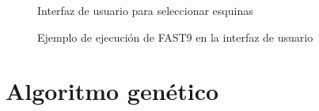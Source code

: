 \documentclass{report}
\begin{document}
\begin{figure}
	\caption{\label{fig:interfaz} Interfaz de usuario para seleccionar esquinas}
\end{figure}

\begin{figure}
	\caption{\label{fig:fast9} Ejemplo de ejecución de FAST9 en la interfaz de usuario}
\end{figure}

\chapter{Algoritmo genético}
\end{document}

